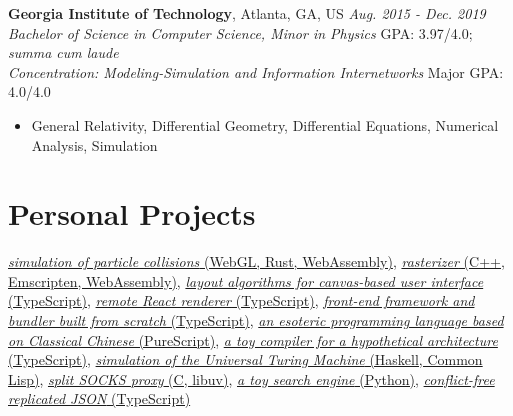 \documentclass[12pt]{article}
\begin{document}
\vspace{1em}
\textbf{Georgia Institute of Technology}, Atlanta, GA, US \hfill \textit{Aug. 2015 - Dec. 2019}\\
\textit{Bachelor of Science in Computer Science, Minor in Physics} \hfill GPA: 3.97/4.0; \textit{summa cum laude}\\
\textit{Concentration: Modeling-Simulation and Information Internetworks} \hfill Major GPA: 4.0/4.0
\begin{itemize}
\item General Relativity, Differential Geometry, Differential Equations, Numerical Analysis, Simulation
\end{itemize}

\section*{Personal Projects}

\href{https://github.com/galmungral/particle-simulation}{\textit{simulation of particle collisions} (WebGL, Rust, WebAssembly)},
\href{https://github.com/galmungral/rasterizer}{\textit{rasterizer} (C++, Emscripten, WebAssembly)},
\href{https://github.com/galmungral/michelangelo}{\textit{layout algorithms for canvas-based user interface} (TypeScript)},
\href{https://github.com/galmungral/react-teletype}{\textit{remote React renderer} (TypeScript)},
\href{https://github.com/galmungral/replay}{\textit{front-end framework and bundler built from scratch} (TypeScript)},
\href{https://github.com/galmungral/hanbun-lang}{\textit{an esoteric programming language based on Classical Chinese} (PureScript)},
\href{https://github.com/galmungral/sketchpad}{\textit{a toy compiler for a hypothetical architecture} (TypeScript)},
\href{https://github.com/galmungral/turing-machine}{\textit{simulation of the Universal Turing Machine} (Haskell, Common Lisp)},
\href{https://github.com/galmungral/telescope}{\textit{split SOCKS proxy} (C, libuv)}, 
\href{https://github.com/galmungral/plato}{\textit{a toy search engine} (Python)},
\href{https://github.com/galmungral/json-crdt}{\textit{conflict-free replicated JSON} (TypeScript)}
\end{document}
